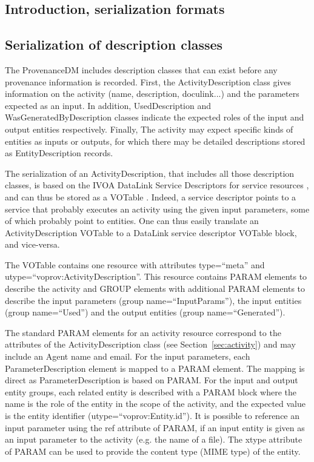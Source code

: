 \subsection{Introduction, serialization formats}
\label{sec:intro-serialization}


\subsection{Serialization of description classes}
\label{sec:description-serialization}
The ProvenanceDM includes description classes that can exist before any provenance information is recorded. First, the ActivityDescription class gives information on the activity (name, description, doculink...) and the parameters expected as an input. In addition, UsedDescription and WasGeneratedByDescription classes indicate the expected roles of the input and output entities respectively. Finally, The activity may expect specific kinds of entities as inputs or outputs, for which there may be detailed descriptions stored as EntityDescription records.

The serialization of an ActivityDescription, that includes all those description classes, is based on the IVOA DataLink Service Descriptors for service resources \citep{std:Datalink}, and can thus be stored as a VOTable  \citep{std:VOTABLE}. Indeed, a service descriptor points to a service that probably executes an activity using the given input parameters, some of which probably point to entities. One can thus easily translate an ActivityDescription VOTable to a DataLink service descriptor VOTable block, and vice-versa. 

The VOTable contains one resource with attributes type=``meta'' and utype=``voprov:ActivityDescription''. This resource contains PARAM elements to describe the activity and GROUP elements with additional PARAM elements to describe the input parameters (group name=``InputParams''), the input entities (group name=``Used'') and the output entities (group name=``Generated''). 

The standard PARAM elements for an activity resource correspond to the attributes of the ActivityDescription class (see Section~\ref{sec:activity}) and may include an Agent name and email. For the input parameters, each ParameterDescription element is mapped to a PARAM element. The mapping is direct as ParameterDescription is based on PARAM. For the input and output entity groups, each related entity is described with a PARAM block where the name is the role of the entity in the scope of the activity, and the expected value is the entity identifier (utype=``voprov:Entity.id''). It is possible to reference an input parameter using the ref attribute of PARAM, if an input entity is given as an input parameter to the activity (e.g. the name of a file). The xtype attribute of PARAM can be used to provide the content type (MIME type) of the entity.


